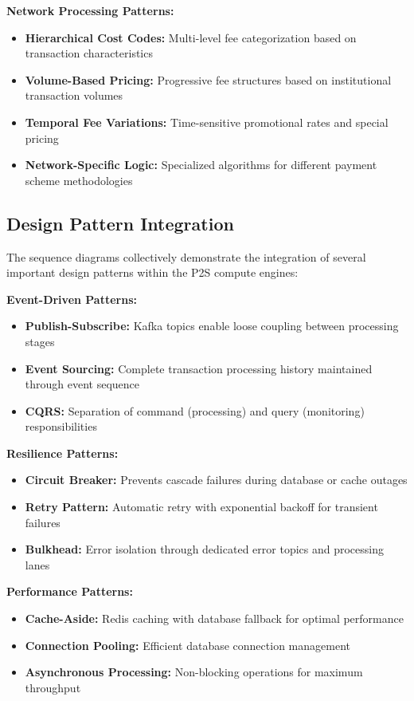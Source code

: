 \textbf{Network Processing Patterns:}
\begin{itemize}
    \item \textbf{Hierarchical Cost Codes:} Multi-level fee categorization based on transaction characteristics
    \item \textbf{Volume-Based Pricing:} Progressive fee structures based on institutional transaction volumes
    \item \textbf{Temporal Fee Variations:} Time-sensitive promotional rates and special pricing
    \item \textbf{Network-Specific Logic:} Specialized algorithms for different payment scheme methodologies
\end{itemize}

\subsection{Design Pattern Integration}

The sequence diagrams collectively demonstrate the integration of several important design patterns within the P2S compute engines:

\textbf{Event-Driven Patterns:}
\begin{itemize}
    \item \textbf{Publish-Subscribe:} Kafka topics enable loose coupling between processing stages
    \item \textbf{Event Sourcing:} Complete transaction processing history maintained through event sequence
    \item \textbf{CQRS:} Separation of command (processing) and query (monitoring) responsibilities
\end{itemize}

\textbf{Resilience Patterns:}
\begin{itemize}
    \item \textbf{Circuit Breaker:} Prevents cascade failures during database or cache outages
    \item \textbf{Retry Pattern:} Automatic retry with exponential backoff for transient failures
    \item \textbf{Bulkhead:} Error isolation through dedicated error topics and processing lanes
\end{itemize}

\textbf{Performance Patterns:}
\begin{itemize}
    \item \textbf{Cache-Aside:} Redis caching with database fallback for optimal performance
    \item \textbf{Connection Pooling:} Efficient database connection management
    \item \textbf{Asynchronous Processing:} Non-blocking operations for maximum throughput
\end{itemize}

